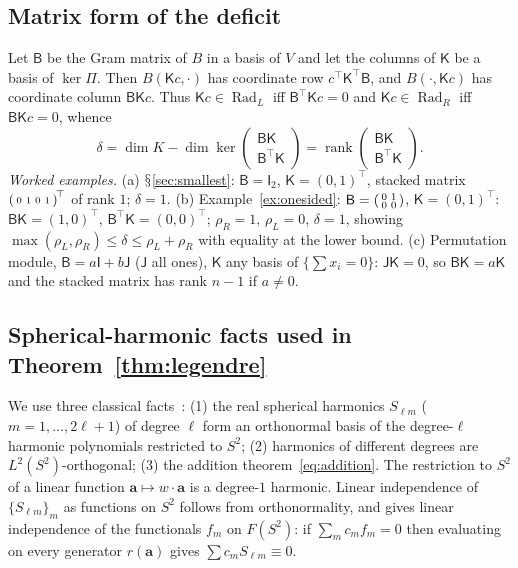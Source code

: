 \documentclass[11pt,a4paper]{article}
\renewcommand{\S}{\ensuremath{\mathsection}}
\newcommand{\Rad}{\operatorname{Rad}}
\newcommand{\rk}{\operatorname{rank}}
\newcommand{\defic}{\delta}
\theoremstyle{plain}
\theoremstyle{definition}
\begin{document}
\subsection{Matrix form of the deficit}
Let $\mathsf B$ be the Gram matrix of $B$ in a basis of $V$ and let the columns of $\mathsf K$ be a basis of $\ker\Pi$. Then $B(\mathsf Kc,\cdot)$ has coordinate row $c^{\!\top}\mathsf K^{\!\top}\mathsf B$, and $B(\cdot,\mathsf Kc)$ has coordinate column $\mathsf B\mathsf Kc$. Thus $\mathsf Kc\in\Rad_L$ iff $\mathsf B^{\!\top}\mathsf Kc=0$ and $\mathsf Kc\in\Rad_R$ iff $\mathsf B\mathsf Kc=0$, whence
\[ \defic=\dim K-\dim\ker\begin{pmatrix}\mathsf B\mathsf K\\\mathsf B^{\!\top}\mathsf K\end{pmatrix}=\rk\begin{pmatrix}\mathsf B\mathsf K\\\mathsf B^{\!\top}\mathsf K\end{pmatrix}. \]
\emph{Worked examples.}
(a) \S\ref{sec:smallest}: $\mathsf B=\mathsf I_2$, $\mathsf K=(0,1)^{\!\top}$, stacked matrix $\begin{psmallmatrix}0&1&0&1\end{psmallmatrix}^{\!\top}$ of rank $1$; $\defic=1$.
(b) Example~\ref{ex:onesided}: $\mathsf B=\begin{psmallmatrix}0&1\\0&0\end{psmallmatrix}$, $\mathsf K=(0,1)^{\!\top}$: $\mathsf B\mathsf K=(1,0)^{\!\top}$, $\mathsf B^{\!\top}\mathsf K=(0,0)^{\!\top}$; $\rho_R=1$, $\rho_L=0$, $\defic=1$, showing $\max(\rho_L,\rho_R)\le\defic\le\rho_L+\rho_R$ with equality at the lower bound.
(c) Permutation module, $\mathsf B=a\mathsf I+b\mathsf J$ ($\mathsf J$ all ones), $\mathsf K$ any basis of $\{\sum x_i=0\}$: $\mathsf J\mathsf K=0$, so $\mathsf B\mathsf K=a\mathsf K$ and the stacked matrix has rank $n-1$ if $a\neq0$.

\subsection{Spherical-harmonic facts used in Theorem~\ref{thm:legendre}}
We use three classical facts~\cite{AAR99}: (1) the real spherical harmonics $S_{\ell m}$ ($m=1,\dots,2\ell+1$) of degree $\ell$ form an orthonormal basis of the degree-$\ell$ harmonic polynomials restricted to $S^2$; (2) harmonics of different degrees are $L^2(S^2)$-orthogonal; (3) the addition theorem~\eqref{eq:addition}. The restriction to $S^2$ of a linear function $\mathbf a\mapsto w\cdot\mathbf a$ is a degree-$1$ harmonic. Linear independence of $\{S_{\ell m}\}_m$ as functions on $S^2$ follows from orthonormality, and gives linear independence of the functionals $f_m$ on $F(S^2)$: if $\sum_mc_mf_m=0$ then evaluating on every generator $r(\mathbf a)$ gives $\sum c_mS_{\ell m}\equiv0$.
\end{document}
